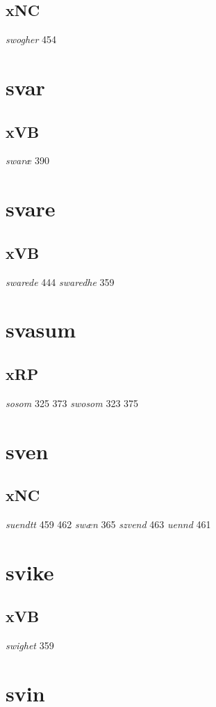 \documentclass[a4paper,twocolumn]{article}
\begin{document}
\subsection{xNC}
\label{sec:org8f2528e}
\emph{swogher} 454 
\section{svar}
\label{sec:org6fcd8ae}
\subsection{xVB}
\label{sec:org60c247c}
\emph{swaræ} 390 
\section{svare}
\label{sec:org2e9922e}
\subsection{xVB}
\label{sec:org8317047}
\emph{swarede} 444 \emph{swaredhe} 359 
\section{svasum}
\label{sec:orgc7fd57a}
\subsection{xRP}
\label{sec:orge5668d3}
\emph{sosom} 325 373 \emph{swosom} 323 375 
\section{sven}
\label{sec:org556fc9a}
\subsection{xNC}
\label{sec:org5b6a55d}
\emph{suendtt} 459 462 \emph{swæn} 365 \emph{szvend} 463 \emph{uennd} 461 
\section{svike}
\label{sec:org7cfe6e1}
\subsection{xVB}
\label{sec:org6bb6c0b}
\emph{swighet} 359 
\section{svin}
\label{sec:orgf679340}
\end{document}
